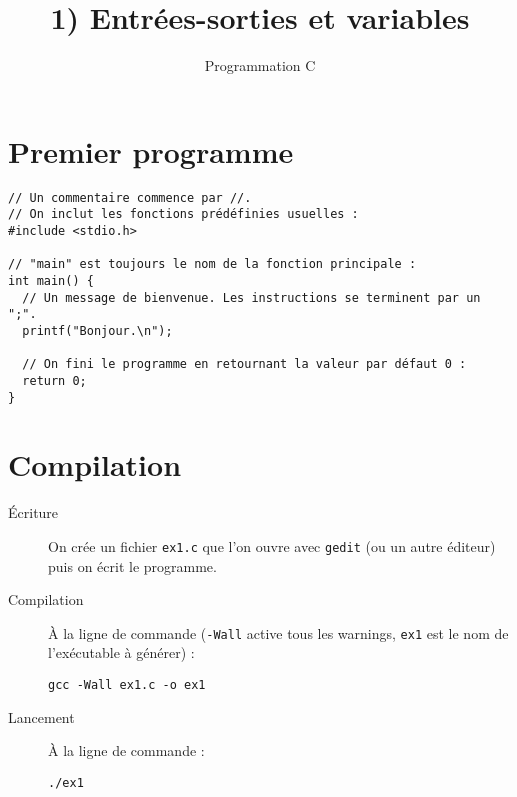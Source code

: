 \documentclass[a4paper,10pt]{article}
\begin{document}
  \title{1) Entrées-sorties et variables}
  \author{Programmation C}
  \date{}
  \maketitle
  
  \section{Premier programme}
  \begin{verbatim}
// Un commentaire commence par //.
// On inclut les fonctions prédéfinies usuelles :
#include <stdio.h>

// "main" est toujours le nom de la fonction principale :
int main() {
  // Un message de bienvenue. Les instructions se terminent par un ";".
  printf("Bonjour.\n");
  
  // On fini le programme en retournant la valeur par défaut 0 :
  return 0;
}
  \end{verbatim}
  
  \section{Compilation}
  \begin{description}
    \item[Écriture] On crée un fichier \texttt{ex1.c} que l'on ouvre avec \texttt{gedit} (ou un autre éditeur) puis on écrit le programme.
    \item[Compilation] À la ligne de commande (\texttt{-Wall} active tous les warnings, \texttt{ex1} est le nom de l'exécutable à générer) :
      \begin{verbatim}
gcc -Wall ex1.c -o ex1
      \end{verbatim}
    \item[Lancement] À la ligne de commande :
      \begin{verbatim}
./ex1
      \end{verbatim}
  \end{description}
  
\end{document}

